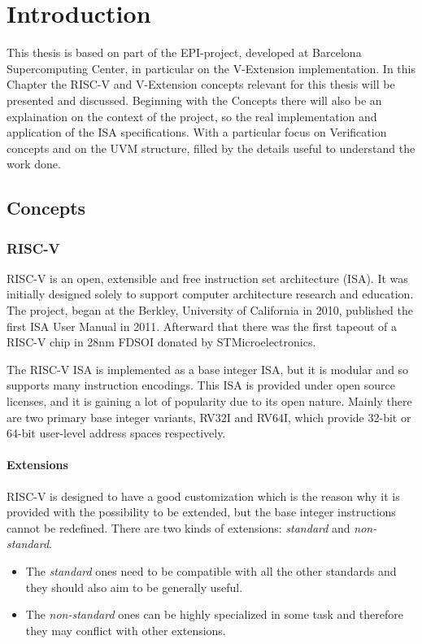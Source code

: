 \chapter{Introduction}
This thesis is based on part of the EPI-project, developed at Barcelona Supercomputing Center, in particular on the V-Extension implementation.
In this Chapter the RISC-V and V-Extension concepts relevant for this thesis will be presented and discussed.
Beginning with the Concepts there will also be an explaination on the context of the project, so the real implementation and application of the ISA specifications.
With a particular focus on Verification concepts and on the UVM structure, filled by the details useful to understand the work done.




\section{Concepts}
\subsection{RISC-V}
RISC-V is an open, extensible and free instruction set architecture (ISA). It was initially designed solely to support computer architecture research and education\cite{RISC-V-Instruction-Set-Manual}.
The project, began at the Berkley, University of California in 2010, published the first ISA User Manual in 2011. Afterward that there was the first tapeout of a RISC-V chip in 28nm FDSOI donated by STMicroelectronics.

The RISC-V ISA is implemented as a base integer ISA, but it is modular and so supports many instruction encodings.
This ISA is provided under open source licenses, and it is gaining a lot of popularity due to its open nature. 
Mainly there are two primary base integer variants, RV32I and RV64I, which provide 32-bit or 64-bit user-level address spaces respectively.

\subsubsection{Extensions}

RISC-V is designed to have a good customization which is the reason why it is provided with the possibility to be extended, but the base integer instructions cannot be redeﬁned.
There are two kinds of extensions:
\textit{standard} and \textit{non-standard}.
\begin{itemize}
    \item The \textit{standard} ones need to be compatible with all the other standards and they should also aim to be generally useful.
    \item The \textit{non-standard} ones can be highly specialized in some task and therefore they may conflict with other extensions.
\end{itemize}

